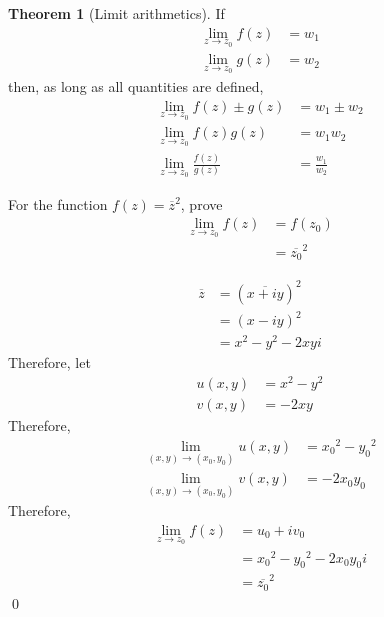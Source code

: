 \documentclass[fleqn, a4paper, 12pt, twoside]{article}
\theoremstyle{definition}
\theoremstyle{theorem}
\newtheorem{theorem}{Theorem}
\begin{document}
\begin{theorem}[Limit arithmetics]
	If
	\begin{align*}
		\lim\limits_{z \to z_0} f(z) & = w_1 \\
		\lim\limits_{z \to z_0} g(z) & = w_2
	\end{align*}
	then, as long as all quantities are defined,
	\begin{align*}
		\lim\limits_{z \to z_0} f(z) \pm g(z)     & = w_1 \pm w_2 \\
		\lim\limits_{z \to z_0} f(z) g(z)         & = w_1 w_2     \\
		\lim\limits_{z \to z_0} \frac{f(z)}{g(z)} & = \frac{w_1}{w_2}
	\end{align*}
\end{theorem}

\begin{question}
	For the function $f(z) = \overline{z}^2$, prove
	\begin{align*}
		\lim\limits_{z \to z_0} f(z) & = f(z_0) \\
                                             & = \overline{z_0}^2
	\end{align*}
\end{question}

\begin{solution}
	\begin{align*}
		\overline{z} & = \left( \overline{x + i y} \right)^2 \\
                             & = (x - i y)^2                         \\
                             & = x^2 - y^2 - 2 x y i
	\end{align*}
	Therefore, let
	\begin{align*}
		u(x,y) & = x^2 - y^2 \\
		v(x,y) & = -2 x y
	\end{align*}
	Therefore,
	\begin{align*}
		\lim\limits_{(x,y) \to (x_0,y_0)} u(x,y) & = {x_0}^2 - {y_0}^2 \\
		\lim\limits_{(x,y) \to (x_0,y_0)} v(x,y) & = -2 x_0 y_0
	\end{align*}
	Therefore,
	\begin{align*}
		\lim\limits_{z \to z_0} f(z) & = u_0 + i v_0                     \\
                                             & = {x_0}^2 - {y_0}^2 - 2 x_0 y_0 i \\
                                             & = \overline{z_0}^2
	\end{align*}
	\qed
\end{solution}
\end{document}
